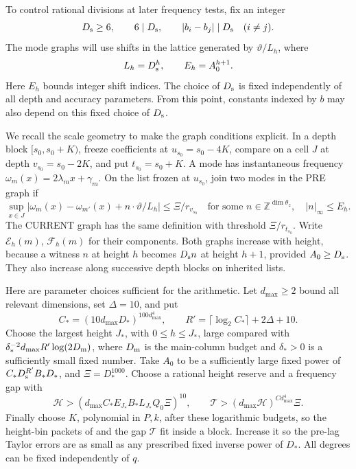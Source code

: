To control rational divisions at later frequency tests, fix an integer
\begin{equation}\label{eq:Ds-choice}
 D_{\rm s}\ge6,\qquad
 6\mid D_{\rm s},\qquad |b_i-b_j|\mid D_{\rm s}\quad(i\ne j).
\end{equation}
The mode graphs will use shifts in the lattice generated by
\(\vartheta/L_h\), where
\begin{equation}\label{eq:height-parameters-b}
 L_h=D_{\rm s}^{h},\qquad E_h=A_0^{h+1}.
\end{equation}
Here \(E_h\) bounds integer shift indices.  The choice of
\(D_{\rm s}\) is fixed independently of all depth and accuracy
parameters.  From this point, constants indexed by \(b\) may also
depend on this fixed choice of \(D_{\rm s}\).

We recall the scale geometry to make the graph conditions explicit.
In a depth block \([s_0,s_0+K)\), freeze coefficients at
\(u_{s_0}=s_0-4K\), compare on a cell \(J\) at depth
\(v_{s_0}=s_0-2K\), and put \(t_{s_0}=s_0+K\).  A mode has instantaneous frequency
\(\omega_m(x)=2\lambda_mx+\gamma_m\).
On the list frozen at \(u_{s_0}\), join two modes in the PRE graph if
\[
 \sup_{x\in J}|\omega_m(x)-\omega_{m'}(x)
                       +n\cdot\vartheta/L_h|
        \le\Xi/r_{v_{s_0}}
 \quad\text{for some }n\in\mathbb Z^{\dim\theta_z},\quad
 |n|_\infty\le E_h.
\]
The CURRENT graph has the same definition with threshold
\(\Xi/r_{t_{s_0}}\).  Write \(\mathcal E_h(m)\),
\(\mathcal F_h(m)\) for their components.  Both graphs increase
with height, because a witness \(n\) at height \(h\) becomes
\(D_{\rm s}n\) at height \(h+1\), provided \(A_0\ge D_{\rm s}\).
They also increase along successive depth blocks on inherited lists.

Here are parameter choices sufficient for the arithmetic.  Let
\(d_{\max}\ge2\) bound all relevant dimensions, set \(\Delta=10\), and put
\[
 C_*=(10d_{\max}D_*)^{100d_{\max}^4},\qquad
 R'=\lceil\log_2C_*\rceil+2\Delta+10.
\]
Choose the largest height \(J_*\), with \(0\le h\le J_*\), large compared with
\(\delta_*^{-2}d_{\max}R'\log(2D_{\rm m})\), where \(D_{\rm m}\)
is the main-column budget and \(\delta_*>0\) is a sufficiently small
fixed number.  Take \(A_0\) to be a sufficiently large fixed power
of \(C_*D_{\rm s}^{R'}B_*D_*\), and \(\Xi=D_*^{1000}\).
Choose a rational height reserve and a frequency gap with
\[
 \mathcal H>
 (d_{\max}C_*E_{J_*}B_*L_{J_*}Q_0\Xi)^{10},\qquad
 \mathcal T>(d_{\max}\mathcal H)^{Cd_{\max}^4}\Xi.
\]
Finally choose \(K\), polynomial in \(P,k\), after these logarithmic
budgets, so the height-bin packets of \cite[Lemma~3.5]{H} and the
gap \(\mathcal T\) fit inside a block.  Increase it so the pre-lag
Taylor errors are as small as any prescribed fixed inverse power of
\(D_*\).  All degrees can be fixed independently of \(q\).

